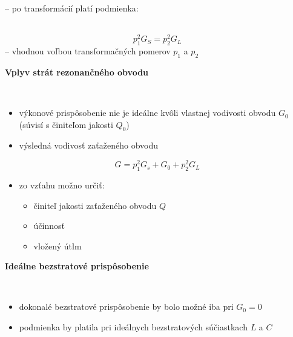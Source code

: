 {{		
	{\raggedright-- po transformácií platí podmienka:}\\
	\begin{equation}
		p_1^2 G_S = p_2^2 G_L
	\end{equation}
	-- vhodnou voľbou transformačných pomerov $p_1$ a $p_2$\\
{\raggedright \textbf{Vplyv strát rezonančného obvodu}}\\	
	\begin{itemize}[label=--]
	\item výkonové prispôsobenie nie je ideálne kvôli vlastnej vodivosti obvodu $G_0$ (súvisí s činiteľom jakosti $Q_0$)
	\item výsledná vodivosť zaťaženého obvodu
	\end{itemize}
	
	\begin{equation}
		G = p_1^2 G_s + G_0 + p_2^2G_L
	\end{equation}
	
	\begin{itemize}[label=--]
		\item zo vzťahu možno určiť:
			\begin{itemize}[label=$\rightarrow$]
			\item činiteľ jakosti zaťaženého obvodu $Q$
			\item účinnosť
			\item vložený útlm
		\end{itemize}
	\end{itemize}	
	
	{\raggedright \textbf{Ideálne bezstratové prispôsobenie}}\\
	\begin{itemize}[label=--]
		\item dokonalé bezstratové prispôsobenie by bolo možné iba pri $G_0 = 0$
		\item podmienka by platila pri ideálnych bezstratových súčiastkach $L$ a $C$
	\end{itemize}	
		
}}
